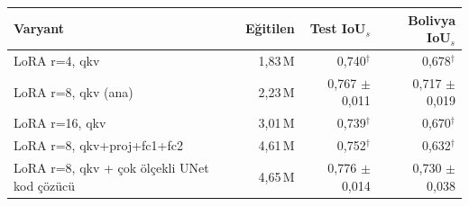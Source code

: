 \begin{tabular}{lrrr}
\toprule
Varyant & Eğitilen & Test IoU$_s$ & Bolivya IoU$_s$ \\
\midrule
LoRA r=4, qkv & 1,83\,M & 0,740$^\dagger$ & 0,678$^\dagger$ \\
LoRA r=8, qkv (ana) & 2,23\,M & 0,767 $\pm$ 0,011 & 0,717 $\pm$ 0,019 \\
LoRA r=16, qkv & 3,01\,M & 0,739$^\dagger$ & 0,670$^\dagger$ \\
LoRA r=8, qkv+proj+fc1+fc2 & 4,61\,M & 0,752$^\dagger$ & 0,632$^\dagger$ \\
LoRA r=8, qkv + çok ölçekli UNet kod çözücü & 4,65\,M & 0,776 $\pm$ 0,014 & 0,730 $\pm$ 0,038 \\
\bottomrule
\end{tabular}
